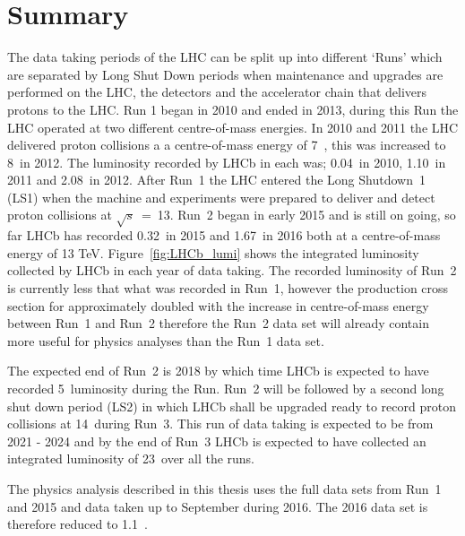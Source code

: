\section{Summary}
\label{LHCb_data}

The data taking periods of the LHC can be split up into different `Runs' which are separated by Long Shut Down periods when maintenance and upgrades are performed on the LHC, the detectors and the accelerator chain that delivers protons to the LHC. Run 1 began in 2010 and ended in 2013, during this Run the LHC operated at two different centre-of-mass energies. In 2010 and 2011 the LHC delivered proton collisions a a centre-of-mass energy of 7~\tev, this was increased to 8~\tev in 2012. The luminosity recorded by LHCb in each was; 0.04~\fb in 2010, 1.10~\fb in 2011 and 2.08~\fb in 2012. After Run~1 the LHC entered the Long Shutdown~1 (LS1) when the machine and experiments were prepared to deliver and detect proton collisions at $\sqrt{s}$~=~13. Run~2 began in early 2015 and is still on going, so far LHCb has recorded 0.32~\fb in 2015 and 1.67~\fb in 2016 both at a centre-of-mass energy of 13 TeV. Figure~\ref{fig:LHCb_lumi} shows the integrated luminosity collected by LHCb in each year of data taking. The recorded luminosity of Run~2 is currently less that what was recorded in Run~1, however the production cross section for \bhadrons approximately doubled with the increase in centre-of-mass energy between Run~1 and Run~2 therefore the Run~2 data set will already contain more \bhadrons useful for physics analyses than the Run~1 data set. 


The expected end of Run~2 is 2018 by which time LHCb is expected to have recorded 5~\fb luminosity during the Run. Run~2 will be followed by a second long shut down period (LS2) in which LHCb shall be upgraded ready to record proton collisions at 14~\tev during Run~3. This run of data taking is expected to be from 2021 - 2024 and by the end of Run~3 LHCb is expected to have collected an integrated luminosity of 23~\fb over all the runs. 

The physics analysis described in this thesis uses the full data sets from Run~1 and 2015 and data taken up to September during 2016. The 2016 data set is therefore reduced to 1.1~\fb.

